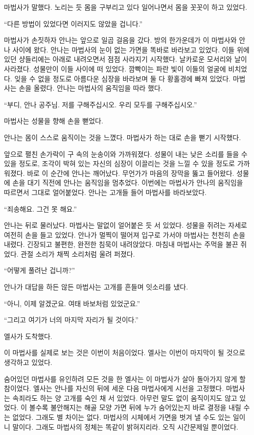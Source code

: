 마법사가 말했다. 노리는 듯 몸을 구부리고 있다 일어나면서 몸을 꼿꼿이 하고 있었다.

``다른 방법이 있었다면 이러지도 않았을 겁니다.''

마법사가 손짓하자 안나는 앞으로 일곱 걸음을 갔다. 방의 한가운데가 이 마법사와 안나 사이에 왔다. 안나는 마법사의 눈이 없는 가면을 똑바로 바라보고 있었다. 이들 위에 있던 샹들리에는 아래로 내려오면서 점점 사라지기 시작했다. 날카로운 모서리와 날이 사라졌다. 성물만이 이들 사이에 떠 있었다. 깜빡이는 파란 빛이 이들의 얼굴에 비치었다. 잊을 수 없을 정도로 아름다운 심장을 바라보며 둘 다 황홀경에 빠져 있었다. 마법사는 손을 올렸다. 안나는 마법사의 움직임을 따라 했다.

``부디, 안나 공주님. 저를 구해주십시오. 우리 모두를 구해주십시오.''

마법사는 성물을 향해 손을 뻗었다.

안나는 몸이 스스로 움직이는 것을 느꼈다. 마법사가 하는 대로 손을 뻗기 시작했다.

앞으로 펼친 손가락이 구 속의 눈송이와 가까워졌다. 성물이 내는 낮은 소리를 들을 수 있을 정도로, 조각이 박혀 있는 자신의 심장이 이끌리는 것을 느낄 수 있을 정도로 가까워졌다. 바로 이 순간에 안나는 깨어났다. 무언가가 마음의 장막을 뚫고 들어왔다. 성물에 손을 대기 직전에 안나는 움직임을 멈추었다. 이번에는 마법사가 안나의 움직임을 따르면서 그대로 얼어붙었다. 안나는 고개들 들어 마법사를 바라보았다.

``죄송해요. 그건 못 해요.''

안나는 뒤로 물러났다. 마법사는 말없이 얼어붙은 듯 서 있었다. 성물을 쥐려는 자세로 여전히 손을 들고 있었다. 안나가 멀찍이 떨어져 입구로 가서야 마법사는 천천히 손을 내렸다. 긴장되고 불편한, 완전한 침묵이 내려앉았다. 마침내 마법사는 주먹을 불끈 쥐었다. 관절 소리가 채찍 소리처럼 울려 퍼졌다.

``어떻게 풀려난 겁니까?''

안나가 대답을 하든 않든 마법사는 고개를 흔들며 잇소리를 냈다.

``아니, 이제 알겠군요. 여태 바보처럼 있었군요.''

``그리고 여기가 너의 마지막 자리가 될 것이다.''

엘사가 도착했다.

\textbreak

이 마법사를 실제로 보는 것은 이번이 처음이었다. 엘사는 이번이 마지막이 될 것으로 생각하고 있었다.

숨어있던 마법사를 유인하려 모든 것을 한 엘사는 이 마법사가 살아 돌아가지 않게 할 참이었다. 엘사는 안나를 자신의 뒤에 세운 다음 마법사에게 시선을 고정했다. 마법사는 속죄라도 하는 양 고개를 숙인 채 서 있었다. 아무런 말도 없이 움직이지도 않고 있었다. 이 볼수록 불안해지는 해골 모양 가면 뒤에 누가 숨어있는지 바로 결정을 내릴 수는 없었다. 그래도 별 차이는 없다. 마법사의 시체에서 가면을 벗겨 낼 수도 있는 일이니 말이다. 그래도 마법사의 정체는 똑같이 밝혀지리라. 오직 시간문제일 뿐이었다.

